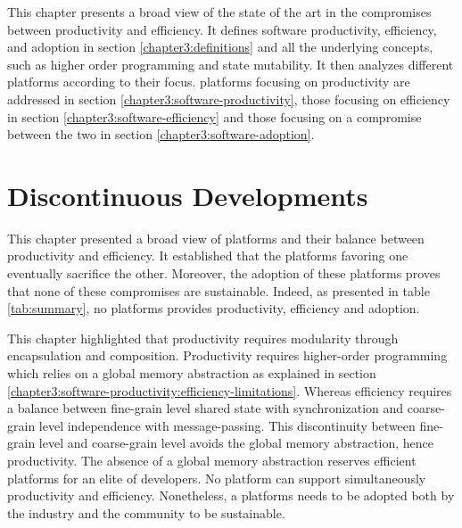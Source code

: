 This chapter presents a broad view of the state of the art in the compromises between productivity and efficiency.
It defines software productivity, efficiency, and adoption in section \ref{chapter3:definitions} and all the underlying concepts, such as higher order programming and state mutability.
It then analyzes different platforms according to their focus. platforms focusing on productivity are addressed in section \ref{chapter3:software-productivity}, those focusing on efficiency in section \ref{chapter3:software-efficiency} and those focusing on a compromise between the two in section \ref{chapter3:software-adoption}.







\section{Discontinuous Developments}

This chapter presented a broad view of platforms and their balance between productivity and efficiency.
It established that the platforms favoring one eventually sacrifice the other.
Moreover, the adoption of these platforms proves that none of these compromises are sustainable.
Indeed, as presented in table \ref{tab:summary}, no platforms provides productivity, efficiency and adoption.


\separator

This chapter highlighted that productivity requires modularity through encapsulation and composition.
Productivity requires higher-order programming which relies on a global memory abstraction as explained in section \ref{chapter3:software-productivity:efficiency-limitations}.
Whereas efficiency requires a balance between fine-grain level shared state with synchronization and coarse-grain level independence with message-passing.
This discontinuity between fine-grain level and coarse-grain level avoids the global memory abstraction, hence productivity.
The absence of a global memory abstraction reserves efficient platforms for an elite of developers.
No platform can support simultaneously productivity and efficiency.
Nonetheless, a platforms needs to be adopted both by the industry and the community to be sustainable.

